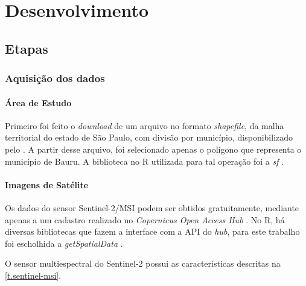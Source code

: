 
\chapter{Desenvolvimento}\label{desenvolvimento}

\section{Etapas}\label{etapas}

\subsection{Aquisição dos dados}\label{aquisicao-dos-dados}

\subsubsection{Área de Estudo}\label{area-de-estudo}

Primeiro foi feito o \emph{download} de um arquivo no
formato \emph{shapefile}, da malha territorial do estado de São Paulo,
com divisão por município, disponibilizado pelo  \cite{ibge-malha}. A partir desse arquivo, foi selecionado apenas o polígono que representa o município de Bauru. A biblioteca no R utilizada para tal operação foi a \textit{sf} \cite{sf}.

\subsubsection{Imagens de Satélite}\label{imagens-de-satelite}

Os dados do sensor Sentinel-2/MSI podem ser obtidos gratuitamente, mediante apenas a um cadastro realizado no \textit{Copernicus Open Access Hub} \cite{sentinel-data}. No R, há diversas bibliotecas que fazem a interface com a API do \textit{hub}, para este trabalho foi escholhida a \textit{getSpatialData} \cite{getSpatialData}. 
    
    O sensor multiespectral do Sentinel-2 possui as características descritas na \autoref{t.sentinel-msi}.

